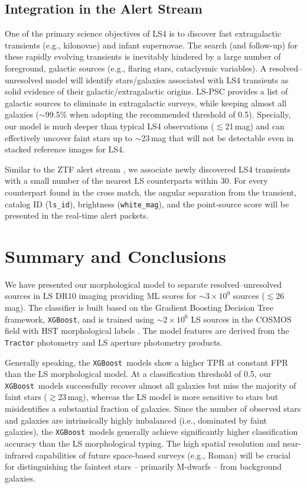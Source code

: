\documentclass[twocolumn]{aastex631}
\newcommand{\xgboost}{\texttt{XGBoost}}
\newcommand{\dr}[1]{DR{#1}}
\begin{document}
\begin{CJK*}{UTF8}{gbsn}
\subsection{Integration in the Alert Stream}
One of the primary science objectives of LS4 is to discover fast extragalactic transients (e.g., kilonovae) and infant supernovae. The search (and follow-up) for these rapidly evolving transients is inevitably hindered by a large number of foreground, galactic sources (e.g., flaring stars, cataclysmic variables). A resolved--unresolved model will identify stars/galaxies associated with LS4 transients as solid evidence of their galactic/extragalactic origins. LS-PSC provides a list of galactic sources to eliminate in extragalactic surveys, while keeping almost all galaxies ($\sim$99.5\% when adopting the recommended threshold of 0.5). Specially, our model is much deeper than typical LS4 observations ($\lesssim$21\,mag) and can effectively uncover faint stars up to $\sim$23\,mag that will not be detectable even in stacked reference images for LS4.

Similar to the ZTF alert stream \citep{ZTF_data_2019}, we associate newly discovered LS4 transients with a small number of the nearest LS counterparts within 30\arcsec. For every counterpart found in the cross match, the angular separation from the transient, catalog ID (\texttt{ls\_id}), brightness (\texttt{white\_mag}), and the point-source score will be presented in the real-time alert packets.

\section{Summary and Conclusions}\label{sec:conclusion}
We have presented our morphological model to separate resolved--unresolved sources in LS \dr{10} imaging providing ML scores for $\sim$$3\times10^9$ sources ($\lesssim$26\,mag). The classifier is built based on the Gradient Boosting Decision Tree framework, \xgboost, and is trained using $\sim$$2\times10^6$ LS sources in the COSMOS field with HST morphological labels \citep{Leauthaud_2007}. The model features are derived from the \texttt{Tractor} photometry and LS aperture photometry products. 

Generally speaking, the \xgboost\ models show a higher TPR at constant FPR than the LS morphological model. At a classification threshold of 0.5, our \xgboost\ models successfully recover almost all galaxies but miss the majority of faint stars ($\gtrsim$23\,mag), whereas the LS model is more sensitive to stars but misidentifies a substantial fraction of galaxies. Since the number of observed stars and galaxies are intrinsically highly imbalanced (i.e., dominated by faint galaxies), the \xgboost\ models generally achieve significantly higher classification accuracy than the LS morphological typing. The high spatial resolution and near-infrared capabilities of future space-based surveys (e.g., Roman) will be crucial for distinguishing the faintest stars -- primarily M-dwarfs -- from background galaxies.


\end{CJK*}
\end{document}
